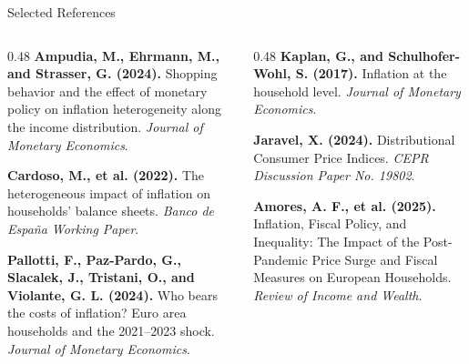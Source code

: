 \documentclass[11pt,aspectratio=169]{beamer}
\begin{document}
\begin{frame}{Selected References}
\small
\begin{columns}[T,onlytextwidth]
\begin{column}{0.48\textwidth}
\textbf{Ampudia, M., Ehrmann, M., and Strasser, G. (2024).}
Shopping behavior and the effect of monetary policy on inflation heterogeneity along the income distribution.
\textit{Journal of Monetary Economics}.
\par\vspace{1em}
\textbf{Cardoso, M., et al. (2022).}
The heterogeneous impact of inflation on households' balance sheets.
\textit{Banco de Espa\~na Working Paper}.
\par\vspace{1em}
\textbf{Pallotti, F., Paz-Pardo, G., Slacalek, J., Tristani, O., and Violante, G. L. (2024).}
Who bears the costs of inflation? Euro area households and the 2021--2023 shock.
\textit{Journal of Monetary Economics}.
\end{column}
\begin{column}{0.48\textwidth}
\textbf{Kaplan, G., and Schulhofer-Wohl, S. (2017).}
Inflation at the household level.
\textit{Journal of Monetary Economics}.
\par\vspace{1em}
\textbf{Jaravel, X. (2024).}
Distributional Consumer Price Indices.
\textit{CEPR Discussion Paper No. 19802}.
\par\vspace{1em}
\textbf{Amores, A. F., et al. (2025).}
Inflation, Fiscal Policy, and Inequality: The Impact of the Post-Pandemic Price Surge and Fiscal Measures on European Households.
\textit{Review of Income and Wealth}.
\end{column}
\end{columns}
\end{frame}
\end{document}
